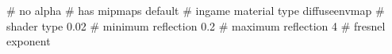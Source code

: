 # no alpha
# has mipmaps
default			 # ingame material type
diffuseenvmap            # shader type
0.02			 # minimum reflection
0.2			 # maximum reflection
4			 # fresnel exponent




